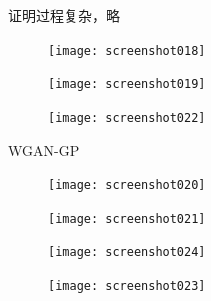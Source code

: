 \documentclass[UTF8]{ctexart} %
\begin{document}
	证明过程复杂，略
	\begin{figure}[H]
	\centering
	\texttt{[image: screenshot018]}
	\caption{}
	\label{fig:screenshot018}
	\end{figure}
	\begin{figure}[H]
	\centering
	\texttt{[image: screenshot019]}
	\caption{}
	\label{fig:screenshot019}
	\end{figure}
	\begin{figure}[H]
	\centering
	\texttt{[image: screenshot022]}
	\caption{}
	\label{fig:screenshot022}
\end{figure}

	WGAN-GP
	\begin{figure}[H]
	\centering
	\texttt{[image: screenshot020]}
	\caption{}
	\label{fig:screenshot020}
	\end{figure}
	\begin{figure}[H]
	\centering
	\texttt{[image: screenshot021]}
	\caption{}
	\label{fig:screenshot021}
	\end{figure}
\begin{figure}[H]
\centering
\texttt{[image: screenshot024]}
\caption{}
\label{fig:screenshot024}
\end{figure}


\begin{figure}[H]
\centering
\texttt{[image: screenshot023]}
\caption{}
\label{fig:screenshot023}
\end{figure}









	
\end{document}
